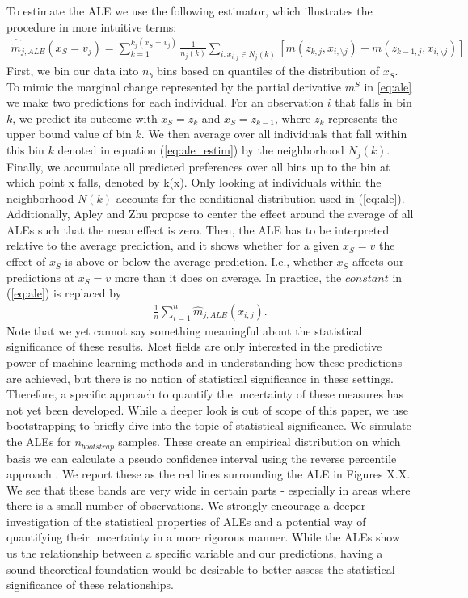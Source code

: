 To estimate the ALE we use the following estimator, which illustrates the procedure in more intuitive terms: 
\begin{align}
\hat{\tilde{m}}_{j, ALE}(x_S=v_j)=\sum_{k=1}^{k_j(x_S=v_j)} \frac{1}{n_j(k)}\sum_{i:x_{i,j}\in N_j(k)}[m(z_{k,j}, x_{i,\setminus j})-m(z_{k-1,j}, x_{i,\setminus j})] \label{eq:ale_estim}
\end{align}
First, we bin our data into $n_b$ bins based on quantiles of the distribution of $x_S$. To mimic the marginal change represented by the partial derivative $m^S$ in \ref{eq:ale} we make two predictions for each individual. For an observation $i$ that falls in bin $k$, we predict its outcome with $x_S=z_k$ and $x_S=z_{k-1}$, where $z_k$ represents the upper bound value of bin $k$. We then average over all individuals that fall within this bin $k$ denoted in equation (\ref{eq:ale_estim}) by the neighborhood $N_j(k)$. Finally, we accumulate all predicted preferences over all bins up to the bin at which point x falls, denoted by k(x). Only looking at individuals within the neighborhood $N(k)$ accounts for the conditional distribution used in (\ref{eq:ale}). \\
Additionally, Apley and Zhu propose to center the effect around the average of all ALEs such that the mean effect is zero. Then, the ALE has to be interpreted relative to the average prediction, and it shows whether for a given $x_S=v$ the effect of $x_S$ is above or below the average prediction. I.e., whether $x_S$ affects our predictions at $x_S=v$ more than it does on average. In practice, the $constant$ in (\ref{eq:ale}) is replaced by 
\begin{align*}
    \frac{1}{n}\sum_{i=1}^n \hat{m}_{j, ALE}(x_{i, j}).
\end{align*}
Note that we yet cannot say something meaningful about the statistical significance of these results. Most fields are only interested in the predictive power of machine learning methods and in understanding how these predictions are achieved, but there is no notion of statistical significance in these settings. Therefore, a specific approach to quantify the uncertainty of these measures has not yet been developed. While a deeper look is out of scope of this paper, we use bootstrapping to briefly dive into the topic of statistical significance. We simulate the ALEs for $n_{bootstrap}$ samples. These create an empirical distribution on which basis we can calculate a pseudo confidence interval using the reverse percentile approach \citep{davisonhenley_1997}. We report these as the red lines surrounding the ALE in Figures X.X. We see that these bands are very wide in certain parts - especially in areas where there is a small number of observations. We strongly encourage a deeper investigation of the statistical properties of ALEs and a potential way of quantifying their uncertainty in a more rigorous manner. While the ALEs show us the relationship between a specific variable and our predictions, having a sound theoretical foundation would be desirable to better assess the statistical significance of these relationships. 

